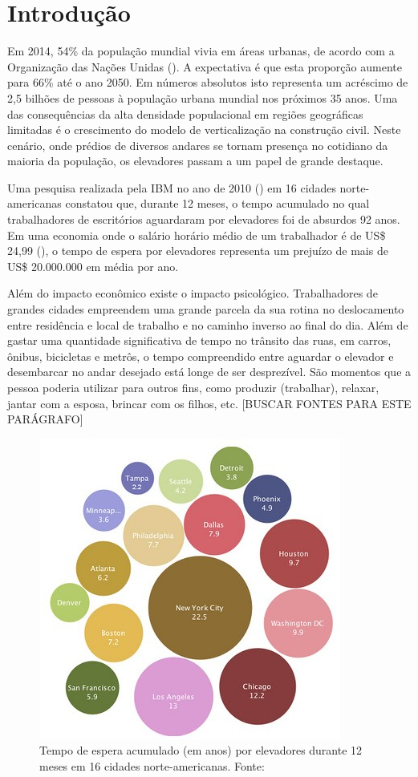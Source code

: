 \chapter{\label{chap:intro}Introdução}

Em 2014, 54\% da população mundial vivia em áreas urbanas, de acordo com a Organização das Nações Unidas (\cite{UN14}). A expectativa é que esta proporção aumente para 66\% até o ano 2050. Em números absolutos isto representa um acréscimo de 2,5 bilhões de pessoas à população urbana mundial nos próximos 35 anos. Uma das consequências da alta densidade populacional em regiões geográficas limitadas é o crescimento do modelo de verticalização na construção civil. Neste cenário, onde prédios de diversos andares se tornam presença no cotidiano da maioria da população, os elevadores passam a um papel de grande destaque.

Uma pesquisa realizada pela IBM no ano de 2010 (\cite{HORN10}) em 16 cidades norte-americanas constatou que, durante 12 meses, o tempo acumulado no qual trabalhadores de escritórios aguardaram por elevadores foi de absurdos 92 anos. Em uma economia onde o salário horário médio de um trabalhador é de US\$ 24,99 (\cite{BLS15}), o tempo de espera por elevadores representa um prejuízo de mais de US\$ 20.000.000 em média por ano.

Além do impacto econômico existe o impacto psicológico. Trabalhadores de grandes cidades empreendem uma grande parcela da sua rotina no deslocamento entre residência e local de trabalho e no caminho inverso ao final do dia. Além de gastar uma quantidade significativa de tempo no trânsito das ruas, em carros, ônibus, bicicletas e metrôs, o tempo compreendido entre aguardar o elevador e desembarcar no andar desejado está longe de ser desprezível. São momentos que a pessoa poderia utilizar para outros fins, como produzir (trabalhar), relaxar, jantar com a esposa, brincar com os filhos, etc. {\color{red}[BUSCAR FONTES PARA ESTE PARÁGRAFO]}

\begin{figure}[htb!]
\centering\includegraphics{img/time-cost.jpg}
\caption{\label{fig:fig1}Tempo de espera acumulado (em anos) por elevadores durante 12 meses em 16 cidades norte-americanas. Fonte: \cite{HORN10}}
\end{figure}

